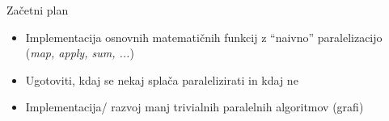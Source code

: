 \documentclass{beamer}
\begin{document}
\begin{frame}{Za\v cetni plan}
    \begin{itemize}
        \item Implementacija osnovnih matemati\v cnih funkcij z ``naivno'' paralelizacijo (\textit{map, apply, sum, ...})
        \item Ugotoviti, kdaj se nekaj spla\v ca paralelizirati in kdaj ne
        \item Implementacija/ razvoj manj trivialnih paralelnih algoritmov (grafi)
    \end{itemize}

\end{frame}
\end{document}
